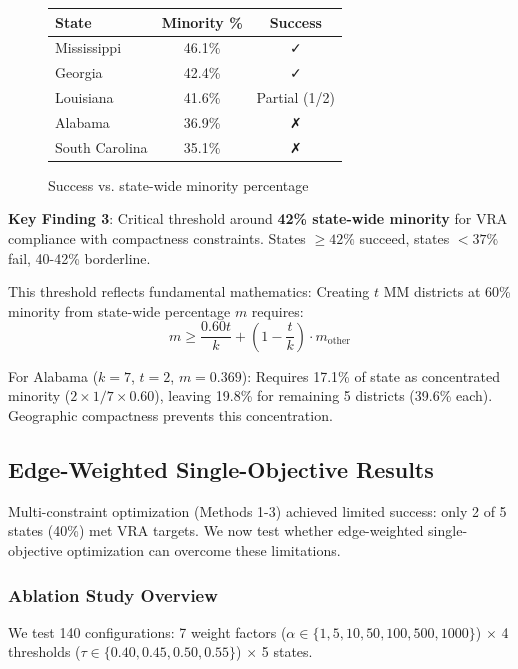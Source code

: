 \begin{figure}[h]
\centering
\begin{tabular}{lcc}
\toprule
State & Minority \% & Success \\
\midrule
Mississippi & 46.1\% & ✓ \\
Georgia & 42.4\% & ✓ \\
Louisiana & 41.6\% & Partial (1/2) \\
Alabama & 36.9\% & ✗ \\
South Carolina & 35.1\% & ✗ \\
\bottomrule
\end{tabular}
\caption{Success vs. state-wide minority percentage}
\label{fig:threshold}
\end{figure}

\textbf{Key Finding 3}: Critical threshold around \textbf{42\% state-wide minority} for VRA compliance with compactness constraints. States $\geq 42\%$ succeed, states $<37\%$ fail, 40-42\% borderline.

This threshold reflects fundamental mathematics: Creating $t$ MM districts at 60\% minority from state-wide percentage $m$ requires:
\begin{equation}
m \geq \frac{0.60t}{k} + (1 - \frac{t}{k}) \cdot m_{\text{other}}
\end{equation}

For Alabama ($k=7$, $t=2$, $m=0.369$): Requires 17.1\% of state as concentrated minority ($2 \times 1/7 \times 0.60$), leaving 19.8\% for remaining 5 districts (39.6\% each). Geographic compactness prevents this concentration.

\subsection{Edge-Weighted Single-Objective Results}

Multi-constraint optimization (Methods 1-3) achieved limited success: only 2 of 5 states (40\%) met VRA targets. We now test whether edge-weighted single-objective optimization can overcome these limitations.

\subsubsection{Ablation Study Overview}

We test 140 configurations: 7 weight factors ($\alpha \in \{1, 5, 10, 50, 100, 500, 1000\}$) $\times$ 4 thresholds ($\tau \in \{0.40, 0.45, 0.50, 0.55\}$) $\times$ 5 states.

